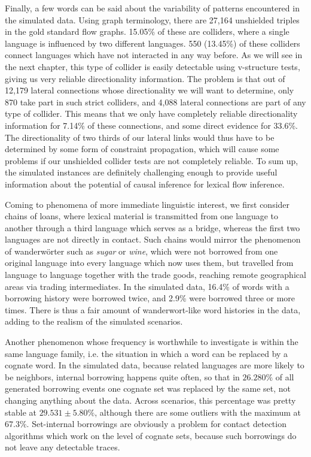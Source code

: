 Finally, a few words can be said about the variability of patterns encountered in the simulated data. Using graph terminology, there are 27,164 unshielded triples in the gold standard flow graphs. 15.05\% of these are colliders, where a single language is influenced by two different languages. 550 (13.45\%) of these colliders connect languages which have not interacted in any way before. As we will see in the next chapter, this type of collider is easily detectable using v-structure tests, giving us very reliable directionality information. The problem is that out of 12,179 lateral connections whose directionality we will want to determine, only 870 take part in such strict colliders, and 4,088 lateral connections are part of any type of collider. This means that we only have completely reliable directionality information for 7.14\% of these connections, and some direct evidence for 33.6\%. The directionality of two thirds of our lateral links would thus have to be determined by some form of constraint 
propagation, which will cause some problems if our unshielded collider tests are not completely reliable. To sum up, the simulated instances are definitely challenging enough to provide useful information about the potential of causal inference for lexical flow inference.

Coming to phenomena of more immediate linguistic interest, we first consider chains of loans, where lexical material is transmitted from one language to another through a third language which serves as a bridge, whereas the first two languages are not directly in contact. Such chains would mirror the phenomenon of wanderw\"orter such as \textit{sugar} or \textit{wine}, which were not borrowed from one original language into every language which now uses them, but travelled from language to language together with the trade goods, reaching remote geographical areas via trading intermediates. In the simulated data, 16.4\% of words with a borrowing history were borrowed twice, and 2.9\% were borrowed three or more times. There is thus a fair amount of wanderwort-like word histories in the data, adding to the realism of the simulated scenarios.

Another phenomenon whose frequency is worthwhile to investigate is  within the same language family, i.e. the situation in which a word can be replaced by a cognate word. In the simulated data, because related languages are more likely to be neighbors, internal borrowing happens quite often, so that in $26.280\%$ of all generated borrowing events one cognate set was replaced by the same set, not changing anything about the data. Across scenarios, this percentage was pretty stable at $29.531 \pm 5.80\%$, although there are some outliers with the maximum at $67.3\%$. Set-internal borrowings are obviously a problem for contact detection algorithms which work on the level of cognate sets, because such borrowings do not leave any detectable traces.

